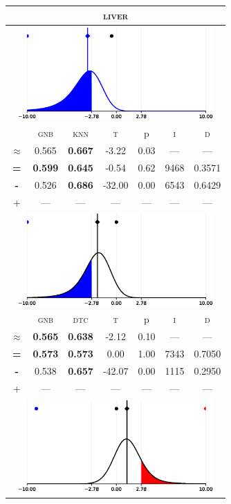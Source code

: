 \begin{tabular}{c||cc||c|c|c||c}
	\toprule
	\multicolumn{7}{c}{\textsc{liver}}\\
	\bottomrule
	\multicolumn{7}{c}{\includegraphics[width=7.5cm, trim=30 0 30 0]{figures/liver_0.eps}}\\

\midrule	&\textsc{gnb} & \textsc{knn} & \textsc{t} & p & \textsc{i} & \textsc{d}\\
	\color{blue} $\approx$ & \color{blue}  0.565 &\color{blue}  \bfseries 0.667 & -3.22 & 0.03 & --- & ---\\\midrule
	{\bfseries\color{black}\tiny=}& \color{black} \bfseries 0.599 & \color{black} \bfseries 0.645 & -0.54 & 0.62 & 9468 & \color{black} 0.3571\\
	{\bfseries\color{blue}\tiny-}& \color{blue}  0.526 & \color{blue} \bfseries 0.686 & -32.00 & 0.00 & 6543 & \color{blue} 0.6429\\
	{\tiny+}& --- & --- & --- & --- & --- & ---\\
	\bottomrule
	\multicolumn{7}{c}{\includegraphics[width=7.5cm, trim=30 0 30 0]{figures/liver_1.eps}}\\

\midrule	&\textsc{gnb} & \textsc{dtc} & \textsc{t} & p & \textsc{i} & \textsc{d}\\
	\color{black} $\approx$ & \color{black} \bfseries 0.565 &\color{black}  \bfseries 0.638 & -2.12 & 0.10 & --- & ---\\\midrule
	{\bfseries\color{black}\tiny=}& \color{black} \bfseries 0.573 & \color{black} \bfseries 0.573 & 0.00 & 1.00 & 7343 & \color{black} 0.7050\\
	{\bfseries\color{blue}\tiny-}& \color{blue}  0.538 & \color{blue} \bfseries 0.657 & -42.07 & 0.00 & 1115 & \color{blue} 0.2950\\
	{\tiny+}& --- & --- & --- & --- & --- & ---\\
	\bottomrule
	\multicolumn{7}{c}{\includegraphics[width=7.5cm, trim=30 0 30 0]{figures/liver_2.eps}}\\


\end{tabular}
